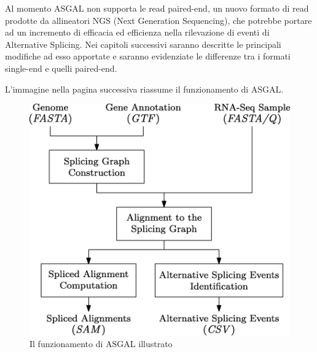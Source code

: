 Al momento ASGAL non supporta le read paired-end, un nuovo formato di read prodotte da allineatori NGS (Next Generation Sequencing), che potrebbe portare ad un incremento di efficacia ed efficienza nella rilevazione di eventi di Alternative Splicing. Nei capitoli successivi saranno descritte le principali modifiche ad esso apportate e saranno evidenziate le differenze tra i formati single-end e quelli paired-end.

L'immagine nella pagina successiva riassume il funzionamento di ASGAL.

\begin{figure}[h!]
	\includegraphics[width=\textwidth]{images/asgal.png}
  \caption{Il funzionamento di ASGAL illustrato}
  \label{fig:ASGAL}
\end{figure}
